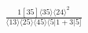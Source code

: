 \documentclass[varwidth, border=5pt]{standalone}
\begin{document}
\begin{my}
$\begin{gathered}
\scriptscriptstyle\frac{1[35]⟨35⟩⟨24⟩^2}{⟨13⟩⟨25⟩⟨45⟩⟨5|1+3|5]}
\end{gathered}$
\end{my}
\end{document}
